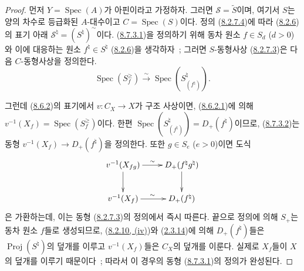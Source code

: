 \begin{proof}
먼저 $Y=\operatorname{Spec}(A)$가 아핀이라고 가정하자. 그러면
$\mathcal{S}=\widetilde{S}$이며, 여기서 $S$는 양의 차수로 등급화된
$A$-대수이고 $C=\operatorname{Spec}(S)$이다. 정의
(\hyperref[II.8.2.6.2-ko]{8.2.7.4})에 따라
(\hyperref[II.8.2.6-ko]{8.2.6})의 표기 아래
$\mathcal{S}^{\natural}=(S^{\natural})^{\sim}$이다.
(\hyperref[II.8.7.3.1-ko]{8.7.3.1})을 정의하기 위해 동차 원소
$f\in S_d$ ($d>0$)와 이에 대응하는 원소
$f^{\natural}\in S^{\natural}$
(\hyperref[II.8.2.6-ko]{8.2.6})을 생각하자~; 그러면 $S$-동형사상
(\hyperref[II.8.2.7.3-ko]{8.2.7.3})은 다음 $C$-동형사상을 정의한다.
\begin{equation}
\label{II.8.7.3.2-ko}
  \operatorname{Spec}(S_f^{\geqslant})
  \xrightarrow{\sim}
  \operatorname{Spec}(S_{(f^{\natural})}^{\natural}).
\tag{8.7.3.2}
\end{equation}

그런데 (\hyperref[II.8.6.2-ko]{8.6.2})의 표기에서
$v:C_X\to X$가 구조 사상이면,
(\hyperref[II.8.6.2.1-ko]{8.6.2.1})에 의해
$v^{-1}(X_f)=\operatorname{Spec}(S_f^{\geqslant})$이다. 한편
$\operatorname{Spec}(S_{(f^{\natural})}^{\natural})=D_+(f^{\natural})$이므로,
(\hyperref[II.8.7.3.2-ko]{8.7.3.2})는 동형
$v^{-1}(X_f)\to D_+(f^{\natural})$을 정의한다. 또한 $g\in S_e$ ($e>0$)이면
도식
\[
  \xymatrix{
    v^{-1}(X_{fg})\ar[r]^{\sim}\ar[d] &
    D_+(f^{\natural}g^{\natural})\ar[d]\\
    v^{-1}(X_f)\ar[r]^{\sim} & D_+(f^{\natural})
  }
\]
은 가환하는데, 이는 동형
(\hyperref[II.8.2.7.3-ko]{8.2.7.3})의 정의에서 즉시 따른다. 끝으로 정의에 의해
$S_+$는 동차 원소 $f$들로 생성되므로,
(\hyperref[II.8.2.10-ko]{8.2.10, (iv)})와
(\hyperref[II.2.3.14-ko]{2.3.14})에 의해 $D_+(f^{\natural})$들은
$\operatorname{Proj}(S^{\natural})$의 덮개를 이루고 $v^{-1}(X_f)$들은
$C_X$의 덮개를 이룬다. 실제로 $X_f$들이 $X$의 덮개를 이루기 때문이다~;
따라서 이 경우의 동형 (\hyperref[II.8.7.3.1-ko]{8.7.3.1})의 정의가
완성된다.


\end{proof}

